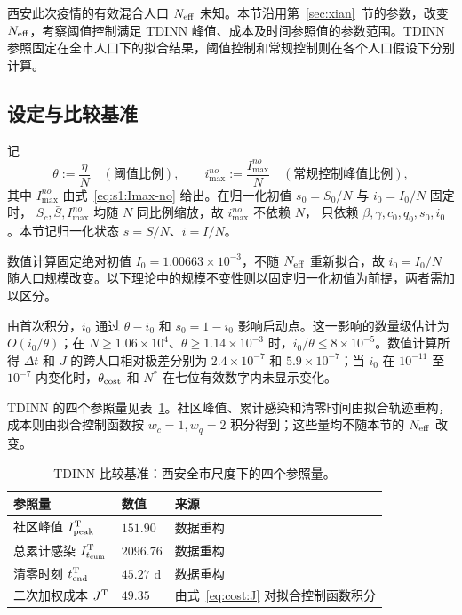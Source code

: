 \documentclass[lang=cn,a4paper,newtx]{elegantpaper}
\numberwithin{equation}{section}
\theoremstyle{plain}
\newcommand{\Itcum}{I_{t_{\mathrm{cum}}}}
\begin{document}
西安此次疫情的有效混合人口 $N_{\rm eff}$ 未知。本节沿用第~\ref{sec:xian}~节的参数，改变 $N_{\rm eff}$，考察阈值控制满足 TDINN 峰值、成本及时间参照值的参数范围。TDINN 参照固定在全市人口下的拟合结果，阈值控制和常规控制则在各个人口假设下分别计算。

\subsection{设定与比较基准}
\label{sec:dom:setup}

记
\begin{equation}
  \theta:=\frac{\eta}{N}\quad(\text{阈值比例}),\qquad
  i_{\max}^{no}:=\frac{I_{\max}^{no}}{N}\quad(\text{常规控制峰值比例}),
  \label{eq:dom:ratios}
\end{equation}
其中 $I_{\max}^{no}$ 由式~\eqref{eq:s1:Imax-no} 给出。在归一化初值 $s_0=S_0/N$ 与 $i_0=I_0/N$ 固定时，
$S_c,\bar S,I_{\max}^{no}$ 均随 $N$ 同比例缩放，故 $i_{\max}^{no}$ 不依赖 $N$，
只依赖 $\beta,\gamma,c_0,q_0,s_0,i_0$。本节记归一化状态 $s=S/N$、$i=I/N$。

数值计算固定绝对初值 $I_0=1.00663\times10^{-3}$，不随 $N_{\rm eff}$ 重新拟合，故 $i_0=I_0/N$ 随人口规模改变。以下理论中的规模不变性则以固定归一化初值为前提，两者需加以区分。

由首次积分，$i_0$ 通过 $\theta-i_0$ 和 $s_0=1-i_0$ 影响启动点。这一影响的数量级估计为 $O(i_0/\theta)$；在 $N\ge1.06\times10^4$、$\theta\ge1.14\times10^{-3}$ 时，$i_0/\theta\le8\times10^{-5}$。数值计算所得 $\Delta t$ 和 $J$ 的跨人口相对极差分别为 $2.4\times10^{-7}$ 和 $5.9\times10^{-7}$；当 $i_0$ 在 $10^{-11}$ 至 $10^{-7}$ 内变化时，$\theta_{\rm cost}$ 和 $N^\ast$ 在七位有效数字内未显示变化。

TDINN 的四个参照量见表~\ref{tab:dom:tdinn}。社区峰值、累计感染和清零时间由拟合轨迹重构，成本则由拟合控制函数按 $w_c=1,w_q=2$ 积分得到；这些量均不随本节的 $N_{\rm eff}$ 改变。

\begin{table}[htbp]
  \centering
  \footnotesize
  \caption{TDINN 比较基准：西安全市尺度下的四个参照量。}
  \label{tab:dom:tdinn}
  \begin{tabular}{lll}
    \toprule
    参照量 & 数值 & 来源 \\
    \midrule
    社区峰值 $I_{\rm peak}^{\rm T}$ & $151.90$ & 数据重构 \\
    总累计感染 $\Itcum^{\rm T}$ & $2096.76$ & 数据重构 \\
    清零时刻 $t_{\rm end}^{\rm T}$ & $45.27$ d & 数据重构 \\
    二次加权成本 $J^{\rm T}$ & $49.35$ & 由式~\eqref{eq:cost:J} 对拟合控制函数积分 \\
    \bottomrule
  \end{tabular}
\end{table}
\end{document}

